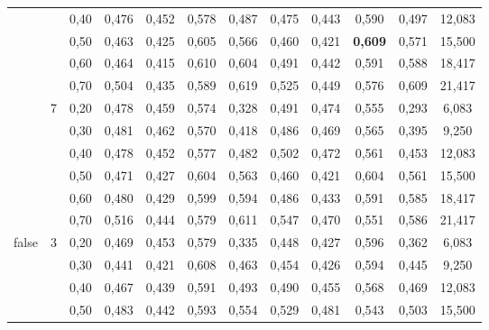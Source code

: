\documentclass{article}
\begin{document}
\begin{table}[!h]
\begin{tabular}{|c|c|c||c|c|c|c||c|c|c|c||c|}
	 && 0,40    & 0,476 & 0,452 & 0,578 & 0,487         &     0,475 &  0,443 & 0,590 & 0,497 & 12,083              \\ \cline{3-12}                  
	 && 0,50    & 0,463 & 0,425 & 0,605 & 0,566         &     0,460 &  0,421 & \cellcolor{gray!20} \textbf{0,609} & 0,571 & 15,500  \\ \cline{3-12} 
	 && 0,60    & 0,464 & 0,415 & 0,610 & 0,604         &     0,491 &  0,442 & 0,591 & 0,588 & 18,417              \\ \cline{3-12}                  
	 && 0,70    & 0,504 & 0,435 & 0,589 & 0,619         &     0,525 &  0,449 & 0,576 & 0,609 & 21,417              \\ \cline{2-12}                  
 & \multirow{6}{*}{7}                                                                                                                               
	  & 0,20    & 0,478 & 0,459 & 0,574 & 0,328         &     0,491 &  0,474 & 0,555 & 0,293 & 6,083               \\ \cline{3-12}                  
	 && 0,30    & 0,481 & 0,462 & 0,570 & 0,418         &     0,486 &  0,469 & 0,565 & 0,395 & 9,250               \\ \cline{3-12}                  
	 && 0,40    & 0,478 & 0,452 & 0,577 & 0,482         &     0,502 &  0,472 & 0,561 & 0,453 & 12,083              \\ \cline{3-12}                  
	 && 0,50    & 0,471 & 0,427 & 0,604 & 0,563         &     0,460 &  0,421 & 0,604 & 0,561 & 15,500              \\ \cline{3-12}                  
	 && 0,60    & 0,480 & 0,429 & 0,599 & 0,594         &     0,486 &  0,433 & 0,591 & 0,585 & 18,417              \\ \cline{3-12}                  
	 && 0,70    & 0,516 & 0,444 & 0,579 & 0,611         &     0,547 &  0,470 & 0,551 & 0,586 & 21,417              \\ \hline                       
\multirow{18}{*}{false} & \multirow{6}{*}{3} 
	  & 0,20    & 0,469 & 0,453 & 0,579 & 0,335         &     0,448 &  0,427 & 0,596 & 0,362 & 6,083               \\ \cline{3-12}  
	 && 0,30    & 0,441 & 0,421 & 0,608 & 0,463         &     0,454 &  0,426 & 0,594 & 0,445 & 9,250               \\ \cline{3-12}  
	 && 0,40    & 0,467 & 0,439 & 0,591 & 0,493         &     0,490 &  0,455 & 0,568 & 0,469 & 12,083              \\ \cline{3-12}  
	 && 0,50    & 0,483 & 0,442 & 0,593 & 0,554         &     0,529 &  0,481 & 0,543 & 0,503 & 15,500              \\ \cline{3-12}  

\end{tabular}
\end{table}
\end{document}
